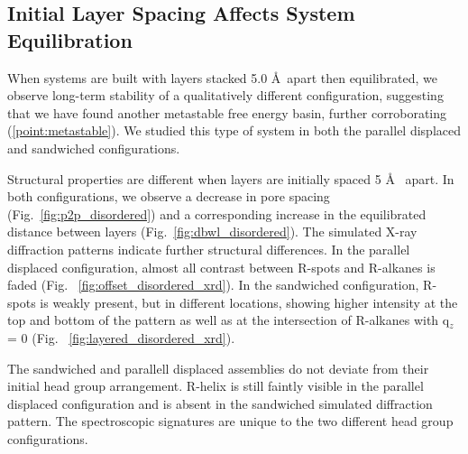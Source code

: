 \documentclass{article}
\newcommand{\angstrom}{\textup{\AA}}
\begin{document}
  \subsection{Initial Layer Spacing Affects System Equilibration}

  When systems are built with layers stacked 5.0 \AA~apart then
  equilibrated, we observe long-term stability of a qualitatively different
  configuration, suggesting that we have found another metastable free energy
  basin, further corroborating (\ref{point:metastable}). We studied this type of
  system in both the parallel displaced and sandwiched configurations. 

  Structural properties are different when layers are initially spaced 5 \AA~
  apart. In both configurations, we observe a decrease in pore spacing
  (Fig.~\ref{fig:p2p_disordered}) and a corresponding increase in the equilibrated
  distance between layers (Fig.~\ref{fig:dbwl_disordered}). The simulated X-ray
  diffraction patterns indicate further structural differences. In the parallel
  displaced configuration, almost all contrast between R-spots and R-alkanes is faded
  (Fig. ~\ref{fig:offset_disordered_xrd}). In the sandwiched
  configuration, R-spots is weakly present, but in different locations, showing higher
  intensity at the top and bottom of the pattern as well as at the intersection
  of R-alkanes with q$_z$ = 0 (Fig. ~\ref{fig:layered_disordered_xrd}). 

  The sandwiched and parallell displaced assemblies do not deviate from their
  initial head group arrangement. R-helix is still faintly visible in the
  parallel displaced configuration and is absent in the sandwiched simulated
  diffraction pattern. The spectroscopic signatures are unique to the two
  different head group configurations.
\end{document}

